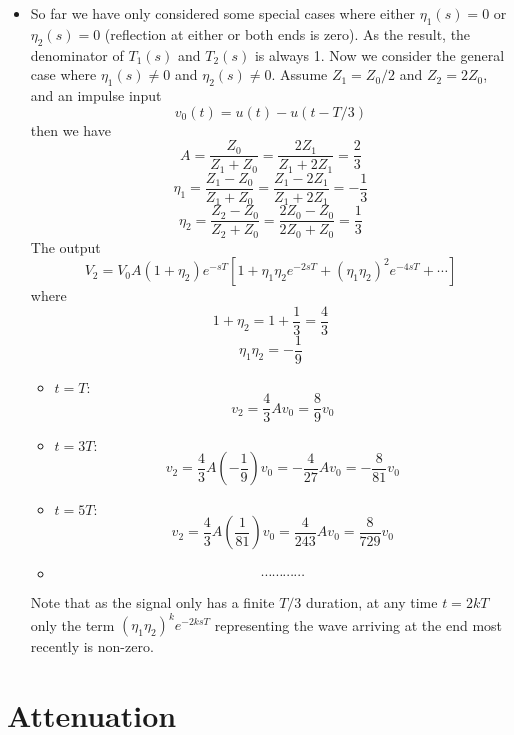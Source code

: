 \begin{itemize}

\item So far we have only considered some special cases where either
$\eta_1(s)=0$ or $\eta_2(s)=0$ (reflection at either or both ends is
zero). As the result, the denominator of $T_1(s)$ and $T_2(s)$ is always 1.
Now we consider the general case where $\eta_1(s)\ne 0$ and $\eta_2(s) 
\ne 0$. Assume $Z_1=Z_0/2$ and $Z_2=2Z_0$, and an impulse input
\[	v_0(t)=u(t)-u(t-T/3)	\]
then we have
\[ A=\frac{Z_0}{Z_1+Z_0}=\frac{2Z_1}{Z_1+2Z_1}=\frac{2}{3} \]
\[ \eta_1=\frac{Z_1-Z_0}{Z_1+Z_0}=\frac{Z_1-2Z_1}{Z_1+2Z_1}=-\frac{1}{3} \]
\[ \eta_2=\frac{Z_2-Z_0}{Z_2+Z_0}=\frac{2Z_0-Z_0}{2Z_0+Z_0}=\frac{1}{3}  \]
The output 
\[	V_2=V_0A(1+\eta_2)e^{-sT}[1+\eta_1\eta_2 e^{-2sT}
	+(\eta_1\eta_2)^2 e^{-4sT}+\cdots ]	\]
where
\[	1+\eta_2=1+\frac{1}{3}=\frac{4}{3}	\]
\[ 	\eta_1 \eta_2=-\frac{1}{9}	\]
\begin{itemize}
\item $t=T:$ 
\[	v_2=\frac{4}{3}Av_0=\frac{8}{9}v_0	\]
\item $t=3T:$ 
\[ v_2=\frac{4}{3}A(-\frac{1}{9})v_0=-\frac{4}{27}Av_0=-\frac{8}{81}v_0 \]
\item $t=5T:$ 
\[ v_2=\frac{4}{3}A(\frac{1}{81})v_0=\frac{4}{243}Av_0=\frac{8}{729}v_0	\]
\item
\[	\cdots  \cdots  \cdots  \cdots  \]
\end{itemize}
Note that as the signal only has a finite $T/3$ duration, at any time $t=2kT$
only the term $(\eta_1\eta_2)^k e^{-2ksT}$ representing the wave arriving at
the end most recently is non-zero.

\end{itemize}

\newpage
\section*{Attenuation}

